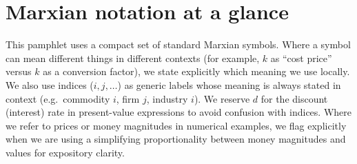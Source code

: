 \section{Marxian notation at a glance}
\label{sec:notation}

\noindent This pamphlet uses a compact set of standard Marxian symbols. Where a symbol can mean different things in different contexts (for example, $k$ as ``cost price'' versus $k$ as a conversion factor), we state explicitly which meaning we use locally. We also use indices ($i,j,\dots$) as generic labels whose meaning is always stated in context (e.g.\ commodity $i$, firm $j$, industry $i$). We reserve $d$ for the discount (interest) rate in present-value expressions to avoid confusion with indices. Where we refer to prices or money magnitudes in numerical examples, we flag explicitly when we are using a simplifying proportionality between money magnitudes and values for expository clarity.

\begingroup
\footnotesize
\setlength{\LTpre}{6pt}      %
\setlength{\LTpost}{0pt}
\setlength{\LTcapwidth}{\textwidth}
\setlength{\tabcolsep}{4pt}
\renewcommand{\arraystretch}{1.18} %

